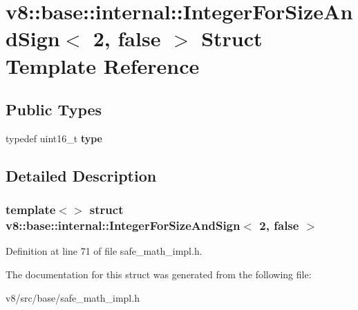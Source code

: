 \hypertarget{structv8_1_1base_1_1internal_1_1IntegerForSizeAndSign_3_012_00_01false_01_4}{}\section{v8\+:\+:base\+:\+:internal\+:\+:Integer\+For\+Size\+And\+Sign$<$ 2, false $>$ Struct Template Reference}
\label{structv8_1_1base_1_1internal_1_1IntegerForSizeAndSign_3_012_00_01false_01_4}
\subsection*{Public Types}
\begin{DoxyCompactItemize}
\item 
\mbox{\label{structv8_1_1base_1_1internal_1_1IntegerForSizeAndSign_3_012_00_01false_01_4_a30a5e48f695b39b9e5c96d43c264f498}} 
typedef uint16\+\_\+t {\bfseries type}
\end{DoxyCompactItemize}


\subsection{Detailed Description}
\subsubsection*{template$<$$>$\newline
struct v8\+::base\+::internal\+::\+Integer\+For\+Size\+And\+Sign$<$ 2, false $>$}



Definition at line 71 of file safe\+\_\+math\+\_\+impl.\+h.



The documentation for this struct was generated from the following file\+:\begin{DoxyCompactItemize}
\item 
v8/src/base/safe\+\_\+math\+\_\+impl.\+h\end{DoxyCompactItemize}
